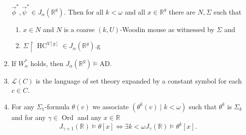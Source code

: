 \documentclass[12pt,a4paper]{article}
\theoremstyle{nicestyle}
\DeclareMathOperator{\HC}{HC}
\DeclareMathOperator{\ord}{Ord}
\begin{document}
\begin{enumerate}
  $\vec{\phi}^{*}, \vec{\psi}^{*} \in
  J_{\alpha}(\mathbb{R}^{g})$. Then for all $k < \omega$ and all
  $x \in \mathbb{R}^g$ there are $N, \Sigma$ such that
  \begin{enumerate}
  \item $x \in N$ and $N$ is a coarse $(k,U)$-Woodin mouse as
    witnessed by $\Sigma$ and
  \item $\Sigma \restriction \HC^{V[g]} \in J_{\alpha}(\mathbb{R}^{g})$.g
  \end{enumerate}
\item If $W_{\alpha}^{*}$ holds, then
  $J_{\alpha}(\mathbb{R}^{g}) \models \mathrm{AD}$.
\item $\mathcal{L}(C)$ is the language of set theory expanded
  by a constant symbol for each $c \in C$.
\item For any $\Sigma_1$-formula $\theta(v)$ we associate
  $(\theta^{k}(v) \mid k < \omega)$ such that $\theta^k$ is $\Sigma_k$
  and for any $\gamma \in \ord$ and any $x \in \mathbb{R}$
  \[
    J_{\gamma+1}(\mathbb{R}) \models \theta[x] \iff \exists k < \omega
    J_{\gamma}(\mathbb{R}) \models \theta^k[x].
  \]


\end{enumerate}
\end{document}
